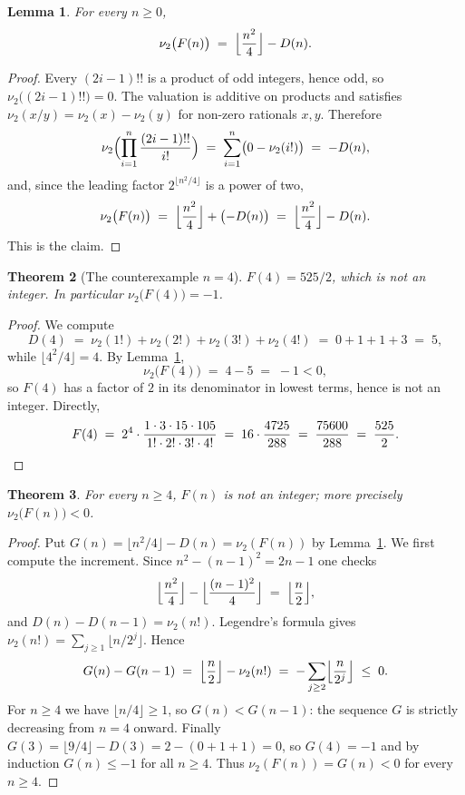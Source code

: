 \documentclass[11pt]{article}
\newtheorem{theorem}{Theorem}
\newtheorem{lemma}[theorem]{Lemma}
\theoremstyle{definition}
\begin{document}
\begin{lemma}\label{lem:valuation}
For every $n\ge 0$,
\[
  \nu_{2}\bigl(F(n)\bigr) \;=\; \Bigl\lfloor \frac{n^{2}}{4}\Bigr\rfloor - D(n).
\]
\end{lemma}

\begin{proof}
Every $(2i-1)!!$ is a product of odd integers, hence odd, so
$\nu_{2}\bigl((2i-1)!!\bigr) = 0$. The valuation is additive on products and
satisfies $\nu_{2}(x/y) = \nu_{2}(x)-\nu_{2}(y)$ for non-zero rationals
$x,y$. Therefore
\[
  \nu_{2}\Bigl(\prod_{i=1}^{n}\frac{(2i-1)!!}{i!}\Bigr)
  \;=\; \sum_{i=1}^{n}\bigl(0-\nu_{2}(i!)\bigr) \;=\; -D(n),
\]
and, since the leading factor $2^{\lfloor n^{2}/4\rfloor}$ is a power of two,
\[
  \nu_{2}\bigl(F(n)\bigr)
  \;=\; \Bigl\lfloor \frac{n^{2}}{4}\Bigr\rfloor + \bigl(-D(n)\bigr)
  \;=\; \Bigl\lfloor \frac{n^{2}}{4}\Bigr\rfloor - D(n).
\]
This is the claim.
\end{proof}

\begin{theorem}[The counterexample $n=4$]\label{thm:four}
$F(4) = 525/2$, which is not an integer. In particular
$\nu_{2}\bigl(F(4)\bigr) = -1$.
\end{theorem}

\begin{proof}
We compute
\[
  D(4) \;=\; \nu_{2}(1!)+\nu_{2}(2!)+\nu_{2}(3!)+\nu_{2}(4!)
  \;=\; 0+1+1+3 \;=\; 5,
\]
while $\lfloor 4^{2}/4\rfloor = 4$. By Lemma~\ref{lem:valuation},
\[
  \nu_{2}\bigl(F(4)\bigr) \;=\; 4 - 5 \;=\; -1 < 0,
\]
so $F(4)$ has a factor of $2$ in its denominator in lowest terms, hence is not
an integer. Directly,
\[
  F(4) \;=\; 2^{4}\cdot\frac{1\cdot 3\cdot 15\cdot 105}{1!\cdot 2!\cdot 3!\cdot 4!}
  \;=\; 16\cdot\frac{4725}{288}
  \;=\; \frac{75600}{288}
  \;=\; \frac{525}{2}. \qedhere
\]
\end{proof}

\begin{theorem}\label{thm:all}
For every $n\ge 4$, $F(n)$ is not an integer; more precisely
$\nu_{2}\bigl(F(n)\bigr) < 0$.
\end{theorem}

\begin{proof}
Put $G(n) = \lfloor n^{2}/4\rfloor - D(n) = \nu_{2}(F(n))$ by
Lemma~\ref{lem:valuation}. We first compute the increment. Since
$n^{2}-(n-1)^{2} = 2n-1$ one checks
\[
  \Bigl\lfloor \frac{n^{2}}{4}\Bigr\rfloor - \Bigl\lfloor \frac{(n-1)^{2}}{4}\Bigr\rfloor
  \;=\; \Bigl\lfloor \frac{n}{2}\Bigr\rfloor,
\]
and $D(n)-D(n-1) = \nu_{2}(n!)$. Legendre's formula gives
$\nu_{2}(n!) = \sum_{j\ge 1}\lfloor n/2^{j}\rfloor$. Hence
\[
  G(n)-G(n-1)
  \;=\; \Bigl\lfloor \frac{n}{2}\Bigr\rfloor - \nu_{2}(n!)
  \;=\; -\sum_{j\ge 2}\Bigl\lfloor \frac{n}{2^{j}}\Bigr\rfloor \;\le\; 0 .
\]
For $n\ge 4$ we have $\lfloor n/4\rfloor \ge 1$, so $G(n) < G(n-1)$: the
sequence $G$ is strictly decreasing from $n=4$ onward. Finally
$G(3) = \lfloor 9/4\rfloor - D(3) = 2 - (0+1+1) = 0$, so $G(4) = -1$ and by
induction $G(n)\le -1$ for all $n\ge 4$. Thus
$\nu_{2}(F(n)) = G(n) < 0$ for every $n\ge 4$.
\end{proof}
\end{document}
